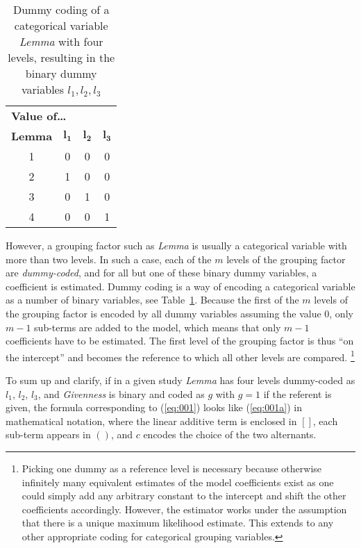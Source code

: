 \begin{table}
  \centering
  \begin{tabular}{cccc}
    \toprule
    \multicolumn{4}{l}{\textbf{Value of\ldots}} \\
    \textbf{Lemma} & $\mathbf{l_1}$ & $\mathbf{l_2}$ & $\mathbf{l_3}$ \\
    \midrule
    1 & 0 & 0 & 0 \\ 
    2 & 1 & 0 & 0 \\ 
    3 & 0 & 1 & 0 \\ 
    4 & 0 & 0 & 1 \\ 
    \bottomrule
  \end{tabular}
  \caption{Dummy coding of a categorical variable \textit{Lemma} with four levels, resulting in the binary dummy variables $l_1,l_2,l_3$}
  \label{tab:dummy}
\end{table}

However, a grouping factor such as \textit{Lemma} is usually a categorical variable with more than two levels.
In such a case, each of the $m$ levels of the grouping factor are \textit{dummy-coded}, and for all but one of these binary dummy variables, a coefficient is estimated.
Dummy coding is a way of encoding a categorical variable as a number of binary variables, see Table~\ref{tab:dummy}.
Because the first of the $m$ levels of the grouping factor is encoded by all dummy variables assuming the value 0, only $m-1$ sub-terms are added to the model, which means that only $m-1$ coefficients have to be estimated.
The first level of the grouping factor is thus ``on the intercept'' and becomes the reference to which all other levels are compared.%
\footnote{Picking one dummy as a reference level is necessary because otherwise infinitely many equivalent estimates of the model coefficients exist as one could simply add any arbitrary constant to the intercept and shift the other coefficients accordingly.
However, the estimator works under the assumption that there is a unique maximum likelihood estimate.
This extends to any other appropriate coding for categorical grouping variables.
}

To sum up and clarify, if in a given study \textit{Lemma} has four levels dummy-coded as $l_1$, $l_2$, $l_3$, and \textit{Givenness} is binary and coded as $g$ with $g=1$ if the referent is given, the formula corresponding to (\ref{eq:001}) looks like (\ref{eq:001a}) in mathematical notation, where the linear additive term is enclosed in $[ ]$, each sub-term appears in $( )$, and $c$ encodes the choice of the two alternants.

